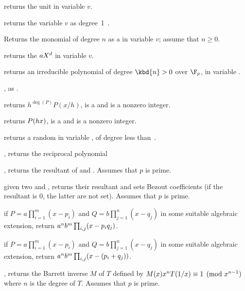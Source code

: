  returns the unit  in variable $v$.

 returns the variable $v$ as degree~1~.

 Returns the monomial of degree $n$ as
a  in variable $v$; assume that $n \geq 0$.

 returns the 
$a\*X^d$ in variable $v$.

 returns an irreducible
polynomial of degree $\kbd{n} > 0$ over $\F_p$, in variable .

, as .

 returns $h^{\deg(P)} P(x/h)$,
 is a  and  is a nonzero integer.

 returns $P(h\*x)$,
 is a  and  is a nonzero integer.

 returns a random 
in variable , of degree less than~.

, returns the reciprocal polynomial

, returns the resultant
of  and . Assumes that $p$ is prime.


given two   and ,
returns their resultant and sets Bezout coefficients (if the resultant is $0$,
the latter are not set). Assumes that $p$ is prime.


 if
$P=a\prod_{i=1}^m(x-p_i)$ and $Q=b\prod_{j=1}^n(x-q_j)$ in some suitable
algebraic extension, return $a^n\*b^m\prod_{i,j}(x-p_i\*q_j)$.

 if
$P=a\prod_{i=1}^m(x-p_i)$ and $Q=b\prod_{j=1}^n(x-q_j)$ in some suitable
algebraic extension, return $a^n\*b^m\prod_{i,j}(x-(p_i+q_j))$.

, returns the Barrett inverse
$M$ of $T$ defined by $M(x)\*x^n\*T(1/x)\equiv 1\pmod{x^{n-1}}$ where $n$ is
the degree of $T$. Assumes that $p$ is prime.


